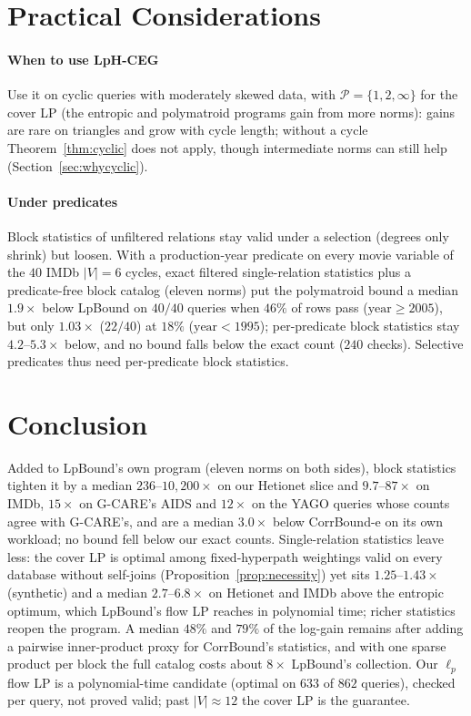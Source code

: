 \documentclass[sigconf, nonacm, acmthm=false]{acmart}
\begin{document}
\section{Practical Considerations}
\label{sec:practical}

\paragraph{When to use LpH-CEG}
Use it on cyclic queries with moderately skewed data, with $\mathcal{P} = \{1,2,\infty\}$ for the cover LP (the entropic and polymatroid programs gain from more norms): gains are rare on triangles and grow with cycle length; without a cycle Theorem~\ref{thm:cyclic} does not apply, though intermediate norms can still help (Section~\ref{sec:whycyclic}).

\paragraph{Under predicates} Block statistics of unfiltered relations stay valid under a selection (degrees only shrink) but loosen. With a production-year predicate on every movie variable of the $40$ IMDb $|V|{=}6$ cycles, exact filtered single-relation statistics plus a predicate-free block catalog (eleven norms) put the polymatroid bound a median $1.9\times$ below LpBound on $40/40$ queries when $46\%$ of rows pass ($\text{year}{\ge}2005$), but only $1.03\times$ ($22/40$) at $18\%$ ($\text{year}{<}1995$); per-predicate block statistics stay $4.2$--$5.3\times$ below, and no bound falls below the exact count ($240$ checks). Selective predicates thus need per-predicate block statistics.

\section{Conclusion}
\label{sec:conclusion}

Added to LpBound's own program (eleven norms on both sides), block
statistics tighten it by a median $236$--$10{,}200\times$ on our Hetionet
slice and $9.7$--$87\times$ on IMDb, $15\times$ on G-CARE's AIDS and
$12\times$ on the YAGO queries whose counts agree with G-CARE's, and are
a median $3.0\times$ below CorrBound-e on its own workload; no
bound fell below our exact counts. Single-relation statistics
leave less: the cover LP is optimal among fixed-hyperpath weightings valid
on every database without self-joins (Proposition~\ref{prop:necessity})
yet sits $1.25$--$1.43\times$ (synthetic) and a median
$2.7$--$6.8\times$ on Hetionet and IMDb above the
entropic optimum, which LpBound's flow LP reaches in polynomial time; richer statistics
reopen the program. A median $48\%$ and $79\%$ of the log-gain remains after adding a pairwise
inner-product proxy for CorrBound's statistics, and with one sparse
product per block the full catalog costs about $8\times$ LpBound's
collection. Our $\ell_p$ flow LP is a polynomial-time candidate (optimal on $633$ of $862$ queries), checked per query, not proved valid; past $|V|{\approx}12$ the cover LP is the guarantee.
\end{document}
